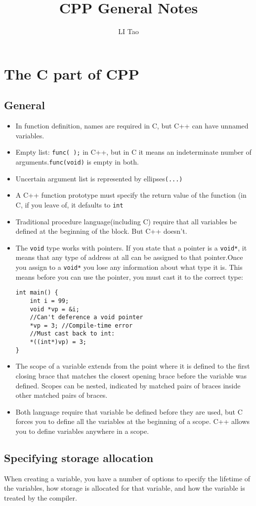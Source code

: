 \documentclass[11pt, a4paper]{book}
\author{LI Tao}
\title{CPP General Notes}
\begin{document}
\chapter{The C part of CPP}
\section{General}

\begin{itemize}
\item In function definition, names are required in C, but C++ can have unnamed
variables.
\item Empty list: \verb|func( );| in C++, but in C it means an indeterminate
number of arguments.\verb|func(void)| is empty in both.
\item Uncertain argument list is represented by ellipses\verb|(...)|
\item A C++ function prototype must specify the return value of the function (in
C, if you leave of, it defaults to \verb|int|
\item Traditional procedure language(including C) require that all variables be
defined at the beginning of the block. But C++ doesn't.
\item The \verb|void| type works with pointers. If you state that a pointer is
a \verb|void*|, it means that any type of address at all can be assigned to that
pointer.Once you assign to a \verb|void*| you lose any information about what
type it is. This means before you can use the pointer, you must cast it to the
correct type:
\begin{verbatim}
int main() {
    int i = 99;
    void *vp = &i;
    //Can't deference a void pointer
    *vp = 3; //Compile-time error
    //Must cast back to int:
    *((int*)vp) = 3;
}
\end{verbatim}

\item The scope of a variable extends from the point where it is defined to the
first closing brace that matches the closest opening brace before the variable
was defined. Scopes can be nested, indicated by matched pairs of braces inside
other matched pairs of braces.
\item Both language require that variable be defined before they are used, but C
forces you to define all the variables at the beginning of a scope. C++ allows
you to define variables anywhere in a scope.
\end{itemize}

\section{Specifying storage allocation}
When creating a variable, you have a number of options to specify the lifetime
of the variables, how storage is allocated for that variable, and how the
variable is treated by the compiler.
\end{document}
